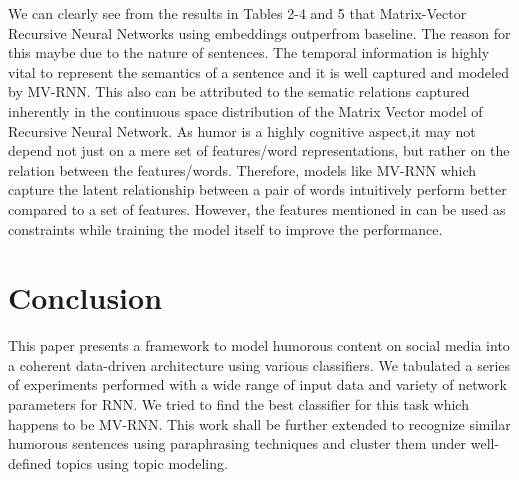 \documentclass{acm_proc_article-sp}
\begin{document}
We can clearly see from the results in Tables 2-4 and 5 that Matrix-Vector Recursive Neural Networks using embeddings outperfrom baseline. The reason for this maybe due to the nature of sentences. The temporal information is highly vital to represent the semantics of a sentence and it is well captured and modeled by MV-RNN. This also can be attributed to the sematic relations captured inherently in the continuous space distribution of the Matrix Vector model of Recursive Neural Network. As humor is a highly cognitive aspect,it may not depend not just on a mere set of features/word representations, but rather on the relation between the features/words. Therefore, models like MV-RNN which capture the latent relationship between a pair of words intuitively perform better compared to a set of features. However, the features mentioned in \cite{zhang2014recognizing} can be used as constraints while training the model itself to improve the performance. 

\section{Conclusion}

This paper presents a framework to model humorous content on social media into a coherent data-driven architecture using various classifiers. We tabulated a series of experiments performed with a wide range of input data and variety of network parameters for RNN. We tried to find the best classifier for this task which happens to be MV-RNN. This work shall be further extended to recognize similar humorous sentences using paraphrasing techniques and cluster them under well-defined topics using topic modeling.




 




%
%












\balancecolumns
\end{document}
